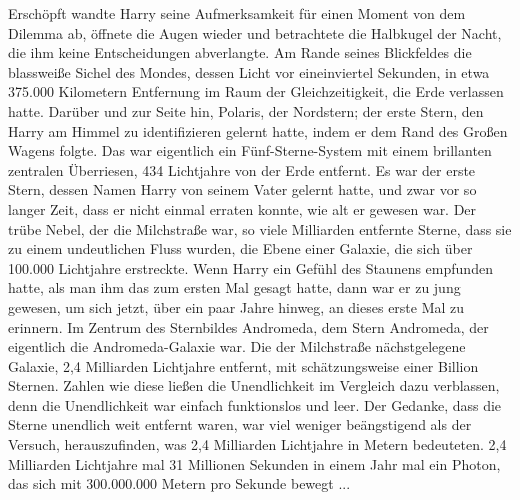 Erschöpft wandte Harry seine Aufmerksamkeit für einen Moment von dem Dilemma ab,
öffnete die Augen wieder und betrachtete die Halbkugel der Nacht, die ihm keine
Entscheidungen abverlangte. Am Rande seines Blickfeldes die blassweiße Sichel
des Mondes, dessen Licht vor eineinviertel Sekunden, in etwa 375.000 Kilometern
Entfernung im Raum der Gleichzeitigkeit, die Erde verlassen hatte. Darüber und
zur Seite hin, Polaris, der Nordstern; der erste Stern, den Harry am Himmel zu
identifizieren gelernt hatte, indem er dem Rand des Großen Wagens folgte. Das
war eigentlich ein Fünf-Sterne-System mit einem brillanten zentralen Überriesen,
434 Lichtjahre von der Erde entfernt. Es war der erste \glqq{}Stern\grqq{},
dessen Namen Harry von seinem Vater gelernt hatte, und zwar vor so langer Zeit,
dass er nicht einmal erraten konnte, wie alt er gewesen war. Der trübe Nebel,
der die Milchstraße war, so viele Milliarden entfernte Sterne, dass sie zu einem
undeutlichen Fluss wurden, die Ebene einer Galaxie, die sich über 100.000
Lichtjahre erstreckte. Wenn Harry ein Gefühl des Staunens empfunden hatte, als
man ihm das zum ersten Mal gesagt hatte, dann war er zu jung gewesen, um sich
jetzt, über ein paar Jahre hinweg, an dieses erste Mal zu erinnern. Im Zentrum
des Sternbildes Andromeda, dem Stern Andromeda, der eigentlich die
Andromeda-Galaxie war. Die der Milchstraße nächstgelegene Galaxie, 2,4
Milliarden Lichtjahre entfernt, mit schätzungsweise einer Billion Sternen.
Zahlen wie diese ließen die \glqq{}Unendlichkeit\grqq{} im Vergleich dazu
verblassen, denn die \glqq{}Unendlichkeit\grqq{} war einfach funktionslos und
leer. Der Gedanke, dass die Sterne \glqq{}unendlich\grqq{} weit entfernt waren,
war viel weniger beängstigend als der Versuch, herauszufinden, was 2,4
Milliarden Lichtjahre in Metern bedeuteten. 2,4 Milliarden Lichtjahre mal 31
Millionen Sekunden in einem Jahr mal ein Photon, das sich mit 300.000.000 Metern
pro Sekunde bewegt ...

